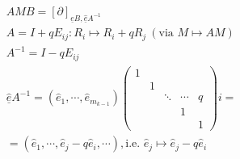 \documentclass[11pt,a4paper]{report}
\begin{document}
              \begin{align*}
                &AMB = [\partial]_{\underline{e}B, \underline{\hat{e}}A^{-1}}\\
                &A = I + qE_{ij}: R_i \mapsto R_i + qR_j \ (\textrm{via } M \mapsto AM)\\
                &A^{-1} = I - qE_{ij}\\
                &\underline{\hat{e}} A^{-1} = (\hat{e}_1, \cdots, \hat{e}_{m_{k-1}})\begin{pmatrix}1 &&&& \\ & 1 &&& \\ && \ddots & \cdots & q\\ &&& 1 &\\ &&&& 1\end{pmatrix}i =\\
                &= (\hat{e}_1, \cdots, \hat{e}_j - q\hat{e}_i, \cdots), \textrm{i.e. } \hat{e}_j \mapsto \hat{e}_j - q\hat{e}_i\\
              \end{align*}
            
\end{document}
